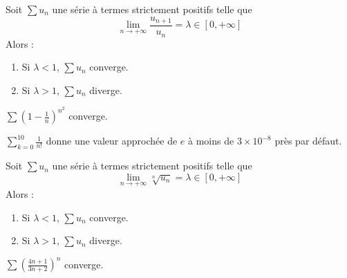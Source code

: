 
	\begin{proposition}
		Soit $\sum u_n$ une série à termes strictement positifs telle que
		\[ \lim_{n \rightarrow +\infty} \frac{u_{n+1}}{u_n} = \lambda \in [0, +\infty] \]
		Alors :
		\begin{enumerate}[label=(\roman*)]
			\item Si $\lambda < 1$, $\sum u_n$ converge.
			\item Si $\lambda > 1$, $\sum u_n$ diverge.
		\end{enumerate}
	\end{proposition}


	\begin{example}
		$\sum \left( 1 - \frac{1}{n} \right)^{n^2}$ converge.
	\end{example}


	\begin{example}
		$\sum_{k=0}^{10} \frac{1}{n!}$ donne une valeur approchée de $e$ à moins de $3 \times 10^{-8}$ près par défaut.
	\end{example}


	\begin{proposition}
		Soit $\sum u_n$ une série à termes strictement positifs telle que
		\[ \lim_{n \rightarrow +\infty} \sqrt[n]{u_n} = \lambda \in [0, +\infty] \]
		Alors :
		\begin{enumerate}[label=(\roman*)]
			\item Si $\lambda < 1$, $\sum u_n$ converge.
			\item Si $\lambda > 1$, $\sum u_n$ diverge.
		\end{enumerate}
	\end{proposition}


	\begin{example}
		$\sum \left( \frac{4n+1}{3n+2} \right)^{n}$ converge.
	\end{example}

